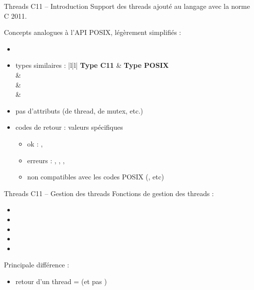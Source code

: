 

\begin {frame} {Threads C11 -- Introduction}
    Support des threads ajouté au langage avec la norme C 2011.

    \vspace* {3mm}

    Concepts analogues à l'API POSIX, légèrement simplifiés :

    \begin {itemize}
	\item {}
	\item types similaires :
	    \ctableau {\fC} {|l|l|} {
		\textbf {Type C11} & \textbf {Type POSIX} \\ \hline
		 &  \\
		 &  \\
		 &  \\
	    }
	\item pas d'attributs (de thread, de mutex, etc.)
	\item codes de retour : valeurs spécifiques
	    \begin {itemize}
		\item ok : ,
		\item erreurs : {\fC {}, ,
		    , }
		\item non compatibles avec les codes POSIX (, etc)
	    \end {itemize}
    \end {itemize}

\end {frame}

\begin {frame} {Threads C11 -- Gestion des threads}
    Fonctions de gestion des threads :

    {\fC
    \begin {itemize}
	\item {}
	\item {}
	\item {}
	\item {}
	\item {}
    \end {itemize}
    }

    Principale différence :

    \begin {itemize}
	\item retour d'un thread =  (et pas )
    \end {itemize}
\end {frame}


